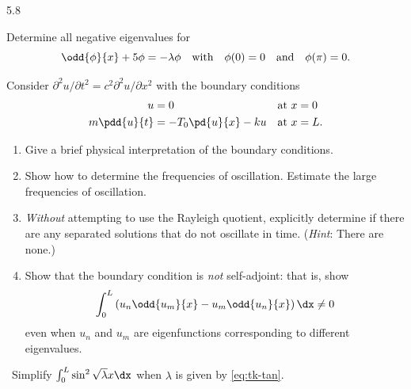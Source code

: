 \begin{exercises}{5.8}
\item Determine all negative eigenvalues for
\[
\odd{\phi}{x} + 5\phi = -\lambda\phi \quad \text{with} \quad \phi(0) = 0 \quad \text{and} \quad \phi(\pi) = 0.
\]

\item Consider $\partial^2u/\partial t^2 = c^2\partial^2u/\partial x^2$ with the boundary conditions
\begin{align*}
u &= 0 & \text{at } x &= 0 \\
m\pdd{u}{t} &= -T_0\pd{u}{x} - ku & \text{at } x &= L.
\end{align*}
\begin{enumerate}
\item Give a brief physical interpretation of the boundary conditions.
\item Show how to determine the frequencies of oscillation.  Estimate the large frequencies of oscillation.
\item \textit{Without} attempting to use the Rayleigh quotient, explicitly determine if there are any separated solutions that do not oscillate in time.  (\textit{Hint}: There are none.)
\item Show that the boundary condition is \textit{not} self-adjoint: that is, show
\[
\int_0^L \left(u_n\odd{u_m}{x} - u_m\odd{u_n}{x}\right)\dx \neq 0
\]
even when $u_n$ and $u_m$ are eigenfunctions corresponding to different eigenvalues.
\end{enumerate}

\item\starred\ Simplify $\int_0^L \sin^2\sqrt{\lambda}x\dx$ when $\lambda$ is given by \eqref{eq:tk-tan}.

\end{exercises}
